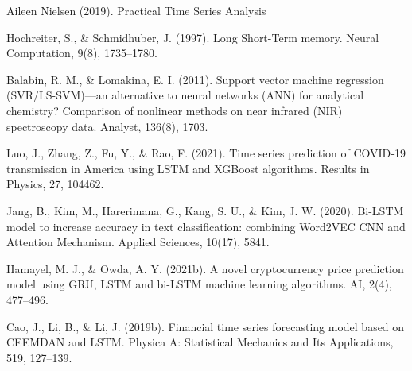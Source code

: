 \documentclass{ieeeojies}
\begin{document}
\noindent[14] Aileen Nielsen (2019). Practical Time Series Analysis

\noindent[15] Hochreiter, S., \& Schmidhuber, J. (1997). Long Short-Term memory. Neural Computation, 9(8), 1735–1780.

\noindent[16]Balabin, R. M., \& Lomakina, E. I. (2011). Support vector machine regression (SVR/LS-SVM)—an alternative to neural networks (ANN) for analytical chemistry? Comparison of nonlinear methods on near infrared (NIR) spectroscopy data. Analyst, 136(8), 1703. 

\noindent[17] Luo, J., Zhang, Z., Fu, Y., \& Rao, F. (2021). Time series prediction of COVID-19 transmission in America using LSTM and XGBoost algorithms. Results in Physics, 27, 104462. 

\noindent [18] Jang, B., Kim, M., Harerimana, G., Kang, S. U., \& Kim, J. W. (2020). Bi-LSTM model to increase accuracy in text classification: combining Word2VEC CNN and Attention Mechanism. Applied Sciences, 10(17), 5841. 

\noindent [19]Hamayel, M. J., \& Owda, A. Y. (2021b). A novel cryptocurrency price prediction model using GRU, LSTM and bi-LSTM machine learning algorithms. AI, 2(4), 477–496. 

\noindent[20]Cao, J., Li, B., & Li, J. (2019b). Financial time series forecasting model based on CEEMDAN and LSTM. Physica A: Statistical Mechanics and Its Applications, 519, 127–139. 
\EOD
\end{document}
